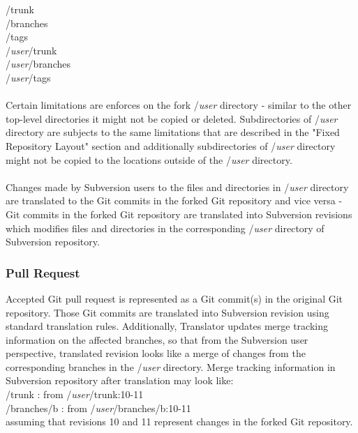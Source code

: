 /trunk\\
/branches\\
/tags\\
/\emph{user}/trunk\\
/\emph{user}/branches\\
/\emph{user}/tags\\\\

Certain limitations are enforces on the fork /\emph{user} directory - similar to the other top-level directories it might not be 
copied or deleted. Subdirectories of /\emph{user} directory are subjects to the same limitations that are described in the "Fixed Repository Layout" section
and additionally subdirectories of /\emph{user} directory might not be copied to the locations outside of the /\emph{user} directory.
\\\\
Changes made by Subversion users to the files and directories in /\emph{user} directory are translated to the Git commits in the forked Git
repository and vice versa - Git commits in the forked Git repository are translated into Subversion revisions which modifies files
and directories in the corresponding /\emph{user} directory of Subversion repository.

\subsubsection{Pull Request}

Accepted Git pull request is represented as a Git commit(s) in the original Git repository. Those Git commits are translated into Subversion
revision using standard translation rules. Additionally, Translator updates merge tracking information on the affected branches, so that
from the Subversion user perspective, translated revision looks like a merge of changes from the corresponding branches in the /\emph{user} directory. 
Merge tracking information in Subversion repository after translation may look like:\\

/trunk : from /\emph{user}/trunk:10-11\\
/branches/b : from /\emph{user}/branches/b:10-11\\

assuming that revisions 10 and 11 represent changes in the forked Git repository.